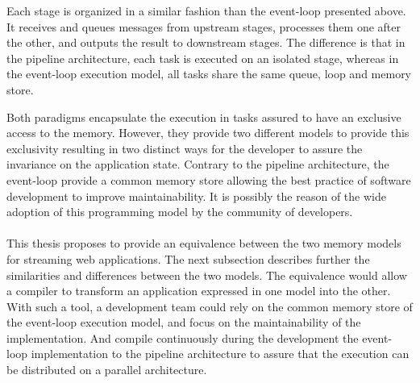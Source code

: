 Each stage is organized in a similar fashion than the event-loop presented above.
It receives and queues messages from upstream stages, processes them one after the other, and outputs the result to downstream stages.
The difference is that in the pipeline architecture, each task is executed on an isolated stage, whereas in the event-loop execution model, all tasks share the same queue, loop and memory store.

Both paradigms encapsulate the execution in tasks assured to have an exclusive access to the memory.
However, they provide two different models to provide this exclusivity resulting in two distinct ways for the developer to assure the invariance on the application state.
Contrary to the pipeline architecture, the event-loop provide a common memory store allowing the best practice of software development to improve maintainability.
It is possibly the reason of the wide adoption of this programming model by the community of developers.

\paragraph{}

This thesis proposes to provide an equivalence between the two memory models for streaming web applications.
The next subsection describes further the similarities and differences between the two models.
The equivalence would allow a compiler to transform an application expressed in one model into the other.
With such a tool, a development team could rely on the common memory store of the event-loop execution model, and focus on the maintainability of the implementation.
And compile continuously during the development the event-loop implementation to the pipeline architecture to assure that the execution can be distributed on a parallel architecture.